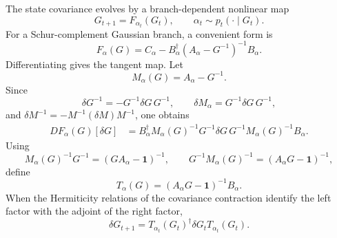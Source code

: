\documentclass[aps,prb,onecolumn,nofootinbib,superscriptaddress]{revtex4-2}
\newcommand{\I}{\mathbf{1}}
\theoremstyle{plain}
\theoremstyle{definition}
\begin{document}
The state covariance evolves by a branch-dependent nonlinear map
\begin{equation}
  G_{t+1}=F_{\alpha_t}(G_t),
  \qquad
  \alpha_t\sim p_t(\cdot\mid G_t).
  \label{eq:branch-markov-map}
\end{equation}
For a Schur-complement Gaussian branch, a convenient form is
\begin{equation}
  F_\alpha(G)
  =
  C_\alpha
  -
  B_\alpha^\dagger
  \left(A_\alpha-G^{-1}\right)^{-1}
  B_\alpha .
  \label{eq:fractional-branch-map}
\end{equation}
Differentiating gives the tangent map.  Let
\begin{equation}
  M_\alpha(G)=A_\alpha-G^{-1}.
  \label{eq:M-alpha}
\end{equation}
Since
\begin{equation}
  \delta G^{-1}=-G^{-1}\delta G\,G^{-1},
  \qquad
  \delta M_\alpha=G^{-1}\delta G\,G^{-1},
  \label{eq:inverse-differentiation}
\end{equation}
and \(\delta M^{-1}=-M^{-1}(\delta M)M^{-1}\), one obtains
\begin{align}
  D F_\alpha(G)[\delta G]
  &=
  B_\alpha^\dagger
  M_\alpha(G)^{-1}
  G^{-1}\delta G\,G^{-1}
  M_\alpha(G)^{-1}
  B_\alpha .
  \label{eq:DF-first-form}
\end{align}
Using
\begin{equation}
  M_\alpha(G)^{-1}G^{-1}=(G A_\alpha-\I)^{-1},
  \qquad
  G^{-1}M_\alpha(G)^{-1}=(A_\alpha G-\I)^{-1},
  \label{eq:noncommuting-identities}
\end{equation}
define
\begin{equation}
  T_\alpha(G)=(A_\alpha G-\I)^{-1}B_\alpha .
  \label{eq:tangent-T}
\end{equation}
When the Hermiticity relations of the covariance contraction identify the left
factor with the adjoint of the right factor,
\begin{equation}
  \delta G_{t+1}
  =
  T_{\alpha_t}(G_t)^\dagger\delta G_tT_{\alpha_t}(G_t).
  \label{eq:tangent-update}
\end{equation}
\end{document}
